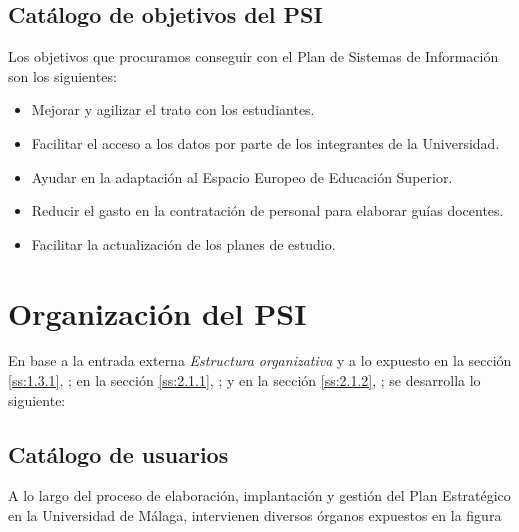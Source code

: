\documentclass[11pt,a4paper,spanish,twoside]{book}
\begin{document}
\subsection{Catálogo de objetivos del PSI} \label{ss:2.1.2}
Los objetivos que procuramos conseguir con el Plan de Sistemas de Información 
son los siguientes:
\begin{itemize}
  \item Mejorar y agilizar el trato con los estudiantes.
  \item Facilitar el acceso a los datos por parte de los integrantes de la 
    Universidad.
  \item Ayudar en la adaptación al Espacio Europeo de Educación Superior.
  \item Reducir el gasto en la contratación de personal para elaborar guías 
    docentes.
  \item Facilitar la actualización de los planes de estudio.
\end{itemize}

\section{Organización del PSI}
En base a la entrada externa \emph{Estructura organizativa} y a lo expuesto
en la sección \vref{ss:1.3.1}, \emph{}; en la sección
\vref{ss:2.1.1}, \emph{}; y en la sección \vref{ss:2.1.2},
\emph{}; se desarrolla lo siguiente:

\subsection{Catálogo de usuarios} \label{ss:2.2.1}
A lo largo del proceso de elaboración, implantación y gestión del Plan 
Estratégico en la Universidad de Málaga, intervienen diversos órganos expuestos 
en la figura %

\end{document}
